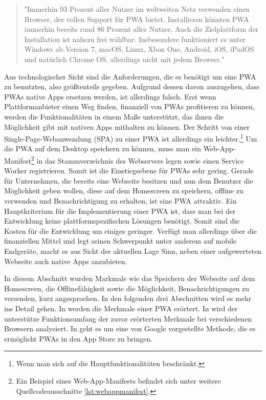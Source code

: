 \begin{quote}
"Immerhin 93 Prozent aller Nutzer im weltweiten Netz verwenden einen Browser, der vollen Support
für PWA bietet. Installieren könnten PWA immerhin bereits rund 86 Prozent aller Nutzer. Auch
die Zielplattform der Installation ist nahezu frei wählbar. Insbesondere funktioniert es
unter Windows ab Version 7, macOS, Linux, Xbox One, Android, iOS, iPadOS und natürlich Chrome OS,
allerdings nicht mit jedem Browser."\cite{T3NPWASupport}
\end{quote}

Aus technologischer Sicht sind die
Anforderungen, die es benötigt um eine PWA zu benutzten, also größtenteils gegeben.
Aufgrund dessen davon auszugehen, dass PWAs native Apps ersetzen werden, ist allerdings
falsch. Erst wenn Plattformanbieter einen Weg finden, finanziell von PWAs profitieren
zu können, werden die Funktionalitäten in einem Maße unterstützt, das ihnen die Möglichkeit
gibt mit nativen Apps mithalten zu können. Der Schritt von einer Single-Page-Webanwendung (SPA) zu einer
PWA ist allerdings ein leichter.\footnote{Wenn man sich auf die Hauptfunktionalitäten beschränkt.}
Um die PWA auf dem Desktop speichern zu können, muss man ein Web-App-Manifest\footnote{
Ein Beispiel eines Web-App-Manifests befindet sich unter weitere Quellcodeausschnitte \ref{lst:webappmanifest}.}
in das Stammverzeichnis des Webservers legen sowie einen Service Worker registrieren.
Somit ist die Einstiegsebene für PWAs sehr gering. Gerade für Unternehmen,
die bereits eine Webseite besitzen und nun dem Benutzer die Möglichkeit geben wollen,
diese auf dem Homescreen zu speichern, offline zu verwenden und Benachrichtigung zu erhalten,
ist eine PWA attraktiv. Ein Hauptkriterium für die Implementierung einer PWA ist, dass man bei der Entwicklung
keine plattformspezifischen Lösungen benötigt. Somit sind die Kosten für die Entwicklung um einiges
geringer. Verfügt man allerdings über die finanziellen Mittel und legt seinen Schwerpunkt unter anderem
auf mobile Endgeräte, macht es aus Sicht der aktuellen Lage Sinn, neben einer aufgewerteten Webseite
auch native Apps anzubieten.

In diesem Abschnitt wurden Markmale wie das Speichern der Webseite auf dem Homescreen,
die Offlinefähigkeit sowie die Möglichkeit, Benachrichtigungen zu versenden, kurz angesprochen.
In den folgenden drei Abschnitten wird es mehr ins Detail gehen. In 
werden die Merkmale einer PWA erörtert. In 
wird der unterstütze Funktionsumfang der zuvor erörterten Merkmale bei verschiedenen Browsern
analysiert. In  geht es um eine von Google vorgestellte Methode,
die es ermöglicht PWAs in den App Store zu bringen.

